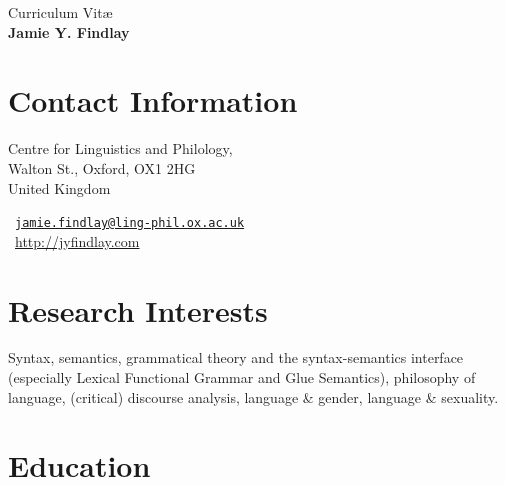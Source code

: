 \documentclass[11pt,a4paper,twoside]{article}
\begin{document}
\thispagestyle{first}

\begin{center}
  {\LARGE Curriculum Vit\ae\\
  \Huge\textbf{Jamie Y. Findlay}\\}
\end{center}

\vspace{1em}

\section*{Contact Information}
\begin{minipage}[t]{0.5\textwidth}
 Centre for Linguistics and Philology,  \\
Walton St., Oxford, OX1 2HG\\
United Kingdom
\end{minipage}
\begin{minipage}[t]{0.55\textwidth}
  \Letter\  \href{mailto:jamie.findlay@ling-phil.ox.ac.uk}{\nolinkurl{jamie.findlay@ling-phil.ox.ac.uk}}\\
  \Keyboard\ \url{http://jyfindlay.com}
\end{minipage}

\section*{Research Interests}

Syntax, semantics, grammatical theory and the syntax-semantics interface (especially Lexical Functional Grammar and Glue Semantics), philosophy of language, (critical) discourse analysis, language \& gender, language \& sexuality.

\section*{Education}
\end{document}
